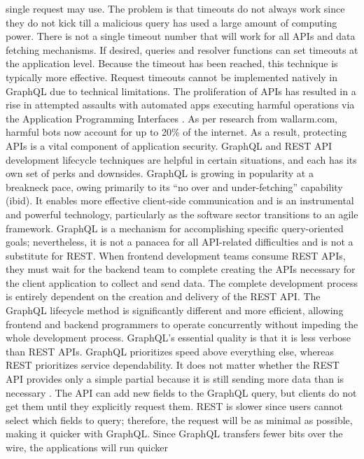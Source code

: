 single request may use. The problem is that timeouts do not always work since
they do not kick till a malicious query has used a large amount of computing
power. There is not a single timeout number that will work for all APIs and data
fetching mechanisms. If desired, queries and resolver functions can set timeouts
at the application level. Because the timeout has been reached, this technique
is typically more effective. Request timeouts cannot be implemented natively in
GraphQL due to technical limitations. The proliferation of APIs has resulted in
a rise in attempted assaults with automated apps executing harmful operations
via the Application Programming Interfaces \citep{
hartigInitialAnalysisFacebook2017}. As per research from wallarm.com, harmful
bots now account for up to 20\% of the internet. As a result, protecting
APIs is a vital component of application security. GraphQL and REST API
development lifecycle techniques are helpful in certain situations, and each has
its own set of perks and downsides. GraphQL is growing in popularity at a
breakneck pace, owing primarily to its ``no over and under-fetching'' capability
(ibid). It enables more effective client-side communication and is an
instrumental and powerful technology, particularly as the software sector
transitions to an agile framework. GraphQL is a mechanism for accomplishing
specific query-oriented goals; nevertheless, it is not a panacea for all
API-related difficulties and is not a substitute for REST. When frontend
development teams consume REST APIs, they must wait for the backend team to
complete creating the APIs necessary for the client application to collect and
send data. The complete development process is entirely dependent on the
creation and delivery of the REST API. The GraphQL lifecycle method is
significantly different and more efficient, allowing frontend and backend
programmers to operate concurrently without impeding the whole development
process. GraphQL's essential quality is that it is less verbose than REST APIs.
GraphQL prioritizes speed above everything else, whereas REST prioritizes
service dependability. It does not matter whether the REST API provides only a
simple partial because it is still sending more data than is necessary
\citep{vadlamaniCanGraphQLReplace2021}. The API can add new fields to the
GraphQL query, but clients do not get them until they explicitly request them.
REST is slower since users cannot select which fields to query; therefore, the
request will be as minimal as possible, making it quicker with GraphQL. Since
GraphQL transfers fewer bits over the wire, the applications will run quicker
